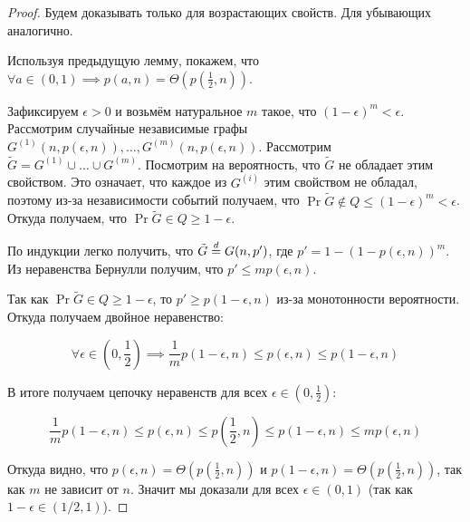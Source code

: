 \begin{proof}
  Будем доказывать только для возрастающих свойств. Для убывающих аналогично.

  Используя предыдущую лемму, покажем, что $\forall a \in (0, 1) \implies
  p(a, n) = \Theta\left(p\left(\frac12, n\right)\right)$.

  Зафиксируем $\epsilon > 0$ и возьмём натуральное $m$ такое, что 
  $(1 - \epsilon)^m < \epsilon$. Рассмотрим случайные независимые графы 
  $G^{(1)}(n, p(\epsilon, n)), \ldots, G^{(m)}(n, p(\epsilon, n))$. Рассмотрим
  $\tilde{G} = G^{(1)} \cup \ldots \cup G^{(m)}$. Посмотрим на вероятность, что
  $\tilde{G}$ не обладает этим свойством. Это означает, что каждое из $G^{(i)}$
  этим свойством не обладал, поэтому из-за независимости событий получаем,
  что $\Pr{\tilde{G} \not\in Q} \leq (1 - \epsilon)^m < \epsilon$. Откуда получаем,
  что $\Pr{\tilde{G} \in Q} \geq 1 - \epsilon$.

  По индукции легко получить, что $\tilde{G} \overset{d}{=} G(n, p')$, где $p' = 1 - (1 - 
  p(\epsilon, n))^m$. Из неравенства Бернулли получим, что $p' \leq m p(\epsilon, n)$.

  Так как $\Pr{\tilde{G} \in Q} \geq 1 - \epsilon$, то $p' \geq p(1 - \epsilon, n)$
  из-за монотонности вероятности. Откуда получаем двойное неравенство:

  \[
    \forall \epsilon \in \left(0, \frac12\right) \implies \frac{1}{m}p(1 - \epsilon, n)
    \leq p(\epsilon, n) \leq p(1 - \epsilon, n)
  \]

  В итоге получаем цепочку неравенств для всех $\epsilon \in \left(0, \frac12\right)$:

  \[
    \frac1m p(1 - \epsilon, n) \leq p(\epsilon, n) \leq p\left(\frac12, n\right)
    \leq p(1 - \epsilon, n) \leq mp(\epsilon, n)
  \]

  Откуда видно, что $p(\epsilon, n) = \Theta\left(p\left(\frac12, n\right)\right)$
  и $p(1 - \epsilon, n) = \Theta\left(p\left(\frac12, n\right)\right)$, так как
  $m$ не зависит от $n$. Значит мы доказали для всех $\epsilon \in (0, 1)$ (так как
  $1 - \epsilon \in (1/2, 1)$).
\end{proof}
